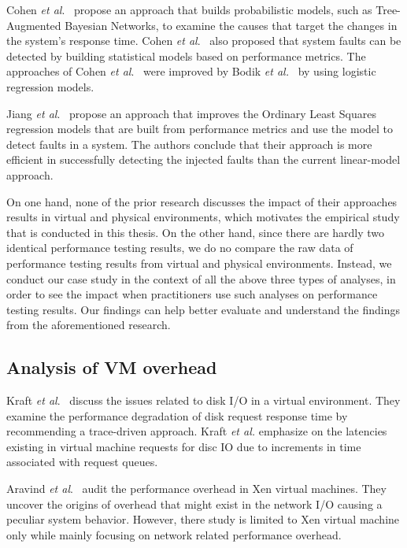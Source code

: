 Cohen \textit{et al$.$}~\cite{cohen2004correlating} propose an approach that builds probabilistic models, such as Tree-Augmented Bayesian Networks, to examine the causes that target the changes in the system's response time. Cohen \textit{et al$.$}~\cite{Cohen:2005:CIC:1095810.1095821} also proposed that system faults can be detected by building statistical models based on performance metrics. The approaches of Cohen \textit{et al$.$}~\cite{cohen2004correlating, Cohen:2005:CIC:1095810.1095821} were improved by Bodik \textit{et al.}~\cite{bodik2008hilighter} by using logistic regression models.

Jiang \emph{et al$.$}~\cite{Jiang:2009:SMM:1555228.1555233} propose an approach that improves the Ordinary Least Squares regression models that are built from performance metrics and use the model to detect faults in a system. The authors conclude that their approach is more efficient in successfully detecting the injected faults than the current linear-model approach.

On one hand, none of the prior research discusses the impact of their approaches results in virtual and physical environments, which motivates the empirical study that is conducted in this thesis. On the other hand, since there are hardly two identical performance testing results, we do no compare the raw data of performance testing results from virtual and physical environments. Instead, we conduct our case study in the context of all the above three types of analyses, in order to see the impact when practitioners use such analyses on performance testing results. Our findings can help better evaluate and understand the findings from the aforementioned research. 



\subsection{Analysis of VM overhead}

Kraft \textit{et al$.$}~\cite{kraft2011io} discuss the issues related to disk I/O in a virtual environment. They examine the performance degradation of disk request response time by recommending a trace-driven approach. Kraft \textit{et al.} emphasize on the latencies existing in virtual machine requests for disc IO due to increments in time associated with request queues. 

Aravind \textit{et al$.$}~\cite{menon2005diagnosing} audit the performance overhead in Xen virtual machines. They uncover the origins of overhead that might exist in the network I/O causing a peculiar system behavior. However, there study is limited to Xen virtual machine only while mainly focusing on network related performance overhead.

